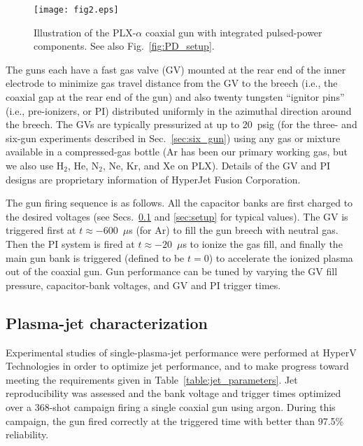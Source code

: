 \documentclass[journal]{IEEEtran}
\begin{document}
\begin{figure}[!b]
\centering
\texttt{[image: fig2.eps]}
\caption{Illustration of the PLX-$\alpha$ coaxial gun with integrated pulsed-power
components.  See also Fig.~\ref{fig:PD_setup}.}
\label{fig:gun}
\end{figure}

The guns each have a fast gas valve (GV) mounted at the rear end of the inner electrode to minimize
gas travel distance from the GV to the breech (i.e., the coaxial gap at the rear end of the gun) and
also twenty tungsten ``ignitor pins'' (i.e., pre-ionizers, or PI) distributed uniformly in the azimuthal 
direction around the breech.  The GVs are typically 
pressurized at up to 20~psig (for the three- and six-gun experiments described in
Sec.~\ref{sec:six_gun}) using any gas or mixture
available in a compressed-gas bottle (Ar has been our primary working gas, but we also 
use H$_2$, He, N$_2$, Ne, Kr, and Xe on PLX)\@.  Details of the 
GV and PI designs are proprietary information of HyperJet Fusion Corporation.

The gun firing sequence is as follows.  All the capacitor banks are first charged to the
desired voltages (see Secs.~\ref{sec:jet_characterization} and \ref{sec:setup} for typical values).
The GV is triggered first at $t\approx -600$~$\mu$s (for
Ar) to fill the gun breech with neutral gas.  Then the PI system is fired at
$t\approx -20$~$\mu$s to ionize the gas fill, and finally the main gun bank is triggered
(defined to be $t=0$) to accelerate the ionized plasma out of the coaxial gun.
Gun performance can be tuned by varying the GV fill pressure, capacitor-bank
voltages, and GV and PI trigger times.

\subsection{Plasma-jet characterization}
\label{sec:jet_characterization}

Experimental studies of single-plasma-jet performance
were performed at HyperV Technologies in order to optimize jet performance, and to
make progress toward meeting the requirements given in
Table~\ref{table:jet_parameters}\@.  Jet reproducibility was assessed
and the bank voltage and trigger times optimized over a 368-shot campaign firing a single coaxial
gun using argon.  During this campaign,
the gun fired correctly at the triggered time with better than 97.5\% reliability.
\end{document}
